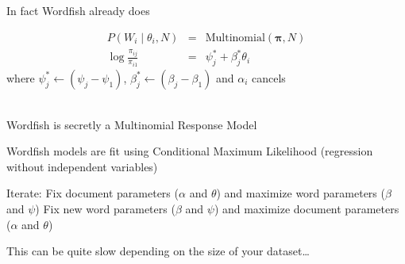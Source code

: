 \documentclass{mediumfoils}
\begin{document}
In fact Wordfish already does

\begin{eqnarray*}
P(W_{i} \mid \theta_{i}, N) &=& \text{Multinomial}(\boldsymbol{\pi}, N)\\
\log \frac{\pi_{ij}}{\pi_{i1}} &=& \psi^{*}_{j} + \beta^{*}_{j}\theta_{i}
\end{eqnarray*}
where $\psi^{*}_{j} \leftarrow (\psi_{j}-\psi_{1})$, $\beta^{*}_{j} \leftarrow (\beta_{j}-\beta_{1})$ and $\alpha_{i}$ cancels

~\\
Wordfish is secretly a Multinomial Response Model

%


Wordfish models are fit using Conditional Maximum Likelihood (regression without independent variables)

Iterate:
\ita
\itm Fix document parameters ($\alpha$ and $\theta$) and maximize word parameters ($\beta$ and $\psi$)
\itm Fix new word parameters ($\beta$ and $\psi$) and maximize document parameters ($\alpha$ and $\theta$)
\itz

This can be quite slow depending on the size of your dataset\ldots



\end{document}
